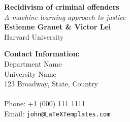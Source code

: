 \documentclass[a0,landscape]{a0poster}
\begin{document}


\begin{minipage}[b]{0.55\linewidth}
\veryHuge \color{NavyBlue} \textbf{Recidivism of criminal offenders} \color{Black}\\ %
\Huge\textit{A machine-learning approach to justice}\\[1cm] %
\huge \textbf{Estienne Granet \& Victor Lei}\\ %
\huge Harvard University\\ %
\end{minipage}
%
\begin{minipage}[b]{0.25\linewidth}
\color{DarkSlateGray}\Large \textbf{Contact Information:}\\
Department Name\\ %
University Name\\
123 Broadway, State, Country\\\\
Phone: +1 (000) 111 1111\\ %
Email: \texttt{john@LaTeXTemplates.com}\\ %
\end{minipage}
%


\vspace{1cm} %

\end{document}
